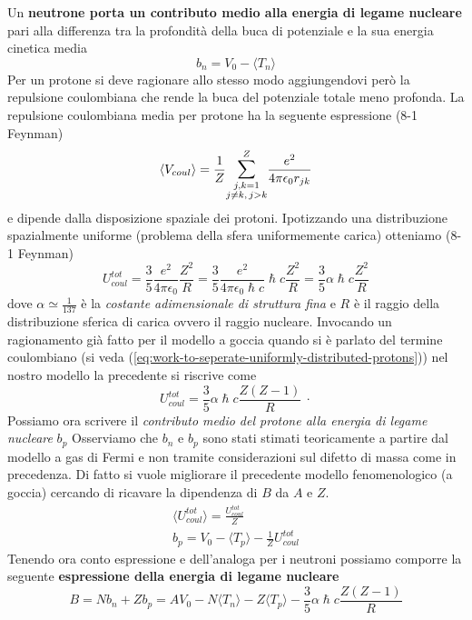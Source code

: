 Un \textbf{neutrone porta un contributo medio alla energia di legame nucleare} pari alla differenza tra la profondità della buca di potenziale e la sua energia cinetica media
\[
b_{n} = V_{0} - \langle T_{n} \rangle
\]
Per un protone si deve ragionare allo stesso modo aggiungendovi però la repulsione coulombiana che rende la buca del potenziale totale meno profonda.
La repulsione coulombiana media per protone ha la seguente espressione (8-1 Feynman\cite{FeynLect2})
\[
	\langle V_{coul} \rangle = \frac{1}{Z} \mathlarger{\sum}_{\substack{j,k=1 \\ j \neq k, \,j > k  }}^{Z} \frac{e^{2}}{4 \pi \epsilon_{0}r_{jk}}\]
e dipende dalla disposizione spaziale dei protoni.
Ipotizzando una distribuzione spazialmente uniforme (problema della sfera uniformemente carica) otteniamo (8-1 Feynman)
\[
U_{coul}^{tot} = \frac{3}{5} \frac{e^{2}}{4 \pi \epsilon_{0}} \frac{Z^{2}}{R} = \frac{3}{5} \frac{e^{2}}{4 \pi \epsilon_{0} \hslash c} \hslash c \frac{Z^{2}}{R} = \frac{3}{5} \alpha \hslash c \frac{Z^{2}}{R}
\]
dove $\alpha \simeq \frac{1}{137}$ è la \emph{costante adimensionale di struttura fina} e $R$ è il raggio della distribuzione sferica di carica ovvero il raggio nucleare.
Invocando un ragionamento già fatto per il modello a goccia quando si è parlato del termine coulombiano (si veda (\ref{eq:work-to-seperate-uniformly-distributed-protons})) nel nostro modello la precedente si riscrive come
\[
U_{coul}^{tot} = \frac{3}{5} \alpha \hslash c \frac{Z (Z-1)}{R} \ \cdot
\]
Possiamo ora scrivere il \emph{contributo medio del protone alla energia di legame nucleare} $b_{p}$\sidenote
{
Osserviamo che $ b_n$ e $ b_p$ sono stati stimati teoricamente a partire dal modello a gas di Fermi e non tramite
considerazioni sul difetto di massa come in precedenza. Di fatto si vuole migliorare il precedente modello fenomenologico
(a goccia) cercando di ricavare la dipendenza di $ B$ da $ A$ e $ Z$.
}
\begin{gather*}
    \langle U^{tot}_{coul} \rangle = \frac{U^{tot}_{coul}}{Z}\\
    b_{p} = V_{0} - \langle T_{p} \rangle  - \frac{1}{Z} U^{tot}_{coul}
\end{gather*}
Tenendo ora conto espressione e dell’analoga per i neutroni possiamo comporre la seguente \textbf{espressione della energia di legame nucleare}
\begin{equation}
	B = N b_{n} + Z b_{p} = A V_{0} - N \langle T_{n} \rangle - Z \langle T_{p} \rangle - \frac{3}{5} \alpha \hslash c \frac{Z(Z-1)}{R}
	\label{eq:binding-energy-fermi-gas-model}
\end{equation}



